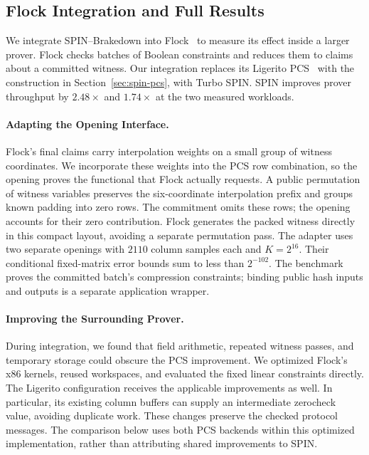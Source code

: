 \subsection{Flock Integration and Full Results}
\label{app:flock-details}

We integrate SPIN--Brakedown into Flock~\cite{flock26} to measure its
effect inside a larger prover. Flock checks batches of Boolean constraints
and reduces them to claims about a committed witness. Our integration
replaces its Ligerito PCS~\cite{ligerito25} with the construction in
Section~\ref{sec:spin-pcs}, with Turbo SPIN. SPIN improves prover throughput
by $2.48\times$ and $1.74\times$ at the two measured workloads.

\paragraph{Adapting the Opening Interface.}
Flock's final claims carry interpolation weights on a small group
of witness coordinates. We incorporate these weights into the PCS row
combination, so the opening proves the functional that Flock actually
requests. A public permutation of witness variables preserves the six-coordinate
interpolation prefix and groups known padding into zero rows. The commitment
omits these rows; the opening accounts for their zero contribution. Flock
generates the packed witness directly in this compact layout, avoiding a
separate permutation pass. The adapter uses
two separate openings with $2110$ column samples each and $K=2^{16}$.
Their conditional fixed-matrix error bounds sum to less than $2^{-102}$.
The benchmark proves the committed batch's
compression constraints; binding public hash inputs and outputs is a
separate application wrapper.

\paragraph{Improving the Surrounding Prover.}
During integration, we found that field arithmetic, repeated witness
passes, and temporary storage could obscure the PCS improvement. We
optimized Flock's x86 kernels, reused workspaces, and evaluated the
fixed linear constraints directly. The Ligerito configuration receives
the applicable improvements as well. In particular, its existing
column buffers can supply an intermediate zerocheck value, avoiding
duplicate work. These changes preserve the checked protocol messages.
The comparison below uses both PCS backends within this optimized
implementation, rather than attributing shared improvements to SPIN.


